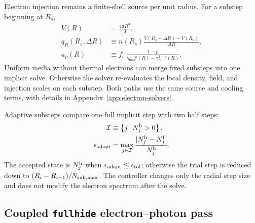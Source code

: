 \documentclass[twocolumn]{aastex702}
\begin{document}
Electron injection remains a finite-shell source per unit radius.  For a substep
beginning at \(R_s\),
\begin{equation}
\begin{aligned}
V(R)&=\frac{4\pi R^3}{3},\\
q_R(R_s,\Delta R)&\equiv
n(R_s)\frac{V(R_s+\Delta R)-V(R_s)}{\Delta R},\\
a_p(R)&\equiv
f_e\,\frac{1-p}{\gamma_{\max}^{1-p}(R)-\gamma_m^{1-p}(R)} .
\end{aligned}
\end{equation}
Uniform media without thermal electrons can merge fixed substeps into one
implicit solve.  Otherwise the solver re-evaluates the local density, field, and
injection scales on each substep.  Both paths use the same source and cooling
terms, with details in Appendix~\ref{app:electron-solvers}.

Adaptive substeps compare one full implicit step with two half steps:
\begin{equation}
\begin{aligned}
\mathcal{I}&\equiv
\left\{j\,\middle|\,N_j^{\rm h}>0\right\},\\
\epsilon_{\rm adapt}&=
\max_{j\in\mathcal{I}}
\frac{|N_j^{\rm h}-N_j^{\rm f}|}
{N_j^{\rm h}} .
\end{aligned}
\end{equation}
The accepted state is \(N_j^{\rm h}\) when
\(\epsilon_{\rm adapt}\le\epsilon_{\rm tol}\); otherwise the trial step is
reduced down to \((R_i-R_{i-1})/N_{\rm sub,max}\).  The controller changes only
the radial step size and does not modify the electron spectrum after the solve.

\subsection{Coupled \texttt{fullhide} electron--photon pass}
\end{document}
